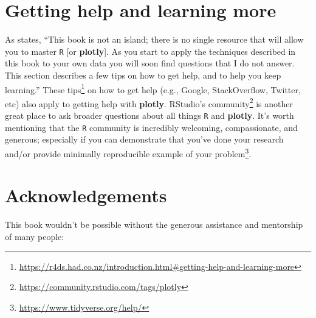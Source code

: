 \documentclass[
  12pt,
]{krantz}
\renewcommand{\href}[2]{#2\footnote{\url{#1}}}
\begin{document}
\hypertarget{getting-help-and-learning-more}{%
\section{Getting help and learning more}\label{getting-help-and-learning-more}}

As \citet{r4ds} states, ``This book is not an island; there is no single resource that will allow you to master \texttt{R} {[}or \textbf{plotly}{]}. As you start to apply the techniques described in this book to your own data you will soon find questions that I do not answer. This section describes a few tips on how to get help, and to help you keep learning.'' \href{https://r4ds.had.co.nz/introduction.html\#getting-help-and-learning-more}{These tips} on how to get help (e.g., Google, StackOverflow, Twitter, etc) also apply to getting help with \textbf{plotly}. \href{https://community.rstudio.com/tags/plotly}{RStudio's community} is another great place to ask broader questions about all things \texttt{R} and \textbf{plotly}. It's worth mentioning that the \texttt{R} community is incredibly welcoming, compassionate, and generous; especially if you can demonstrate that you've done your research and/or \href{https://www.tidyverse.org/help/}{provide minimally reproducible example of your problem}.

\hypertarget{acknowledgements}{%
\section{Acknowledgements}\label{acknowledgements}}

This book wouldn't be possible without the generous assistance and mentorship of many people:
\end{document}
